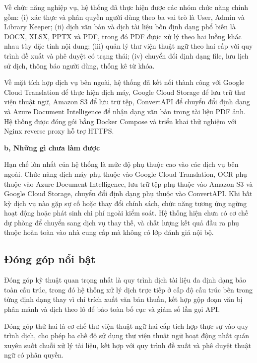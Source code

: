 \documentclass[../DoAn.tex]{subfiles}
\begin{document}
Về chức năng nghiệp vụ, hệ thống đã thực hiện được các nhóm chức năng chính gồm: (i) xác thực và phân quyền người dùng theo ba vai trò là User, Admin và Library Keeper; (ii) dịch văn bản và dịch tài liệu bốn định dạng phổ biến là DOCX, XLSX, PPTX và PDF, trong đó PDF được xử lý theo hai luồng khác nhau tùy đặc tính nội dung; (iii) quản lý thư viện thuật ngữ theo hai cấp với quy trình đề xuất và phê duyệt có trạng thái; (iv) chuyển đổi định dạng file, lưu lịch sử dịch, thông báo người dùng, thống kê từ khóa.

Về mặt tích hợp dịch vụ bên ngoài, hệ thống đã kết nối thành công với Google Cloud Translation để thực hiện dịch máy, Google Cloud Storage để lưu trữ thư viện thuật ngữ, Amazon S3 để lưu trữ tệp, ConvertAPI để chuyển đổi định dạng và Azure Document Intelligence để nhận dạng văn bản trong tài liệu PDF ảnh. Hệ thống được đóng gói bằng Docker Compose và triển khai thử nghiệm với Nginx reverse proxy hỗ trợ HTTPS.

\textbf{b, Những gì chưa làm được}

Hạn chế lớn nhất của hệ thống là mức độ phụ thuộc cao vào các dịch vụ bên ngoài. Chức năng dịch máy phụ thuộc vào Google Cloud Translation, OCR phụ thuộc vào Azure Document Intelligence, lưu trữ tệp phụ thuộc vào Amazon S3 và Google Cloud Storage, chuyển đổi định dạng phụ thuộc vào ConvertAPI. Khi bất kỳ dịch vụ nào gặp sự cố hoặc thay đổi chính sách, chức năng tương ứng ngừng hoạt động hoặc phát sinh chi phí ngoài kiểm soát. Hệ thống hiện chưa có cơ chế dự phòng để chuyển sang dịch vụ thay thế, và chất lượng kết quả đầu ra phụ thuộc hoàn toàn vào nhà cung cấp mà không có lớp đánh giá nội bộ.

\subsection{Đóng góp nổi bật}

Đóng góp kỹ thuật quan trọng nhất là quy trình dịch tài liệu đa định dạng bảo toàn cấu trúc, trong đó hệ thống xử lý dịch trực tiếp ở cấp độ cấu trúc bên trong từng định dạng thay vì chỉ trích xuất văn bản thuần, kết hợp gộp đoạn văn bị phân mảnh và dịch theo lô để bảo toàn bố cục và giảm số lần gọi API.

Đóng góp thứ hai là cơ chế thư viện thuật ngữ hai cấp tích hợp thực sự vào quy trình dịch, cho phép ba chế độ sử dụng thư viện thuật ngữ hoạt động nhất quán xuyên suốt chuỗi xử lý tài liệu, kết hợp với quy trình đề xuất và phê duyệt thuật ngữ có phân quyền.
\end{document}
